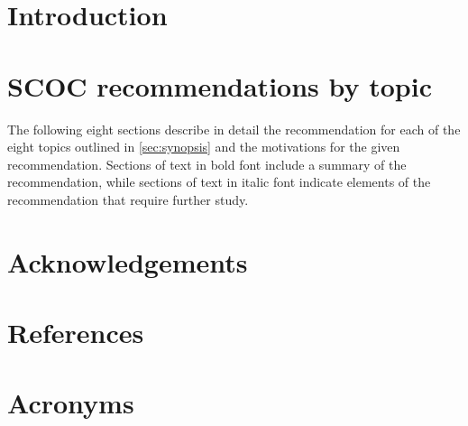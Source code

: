 \section{Introduction}




%
\clearpage
\section{SCOC recommendations by topic}\label{sec:rec}
The following eight sections describe in detail the recommendation for each of the eight topics outlined in \autoref{sec:synopsis} and the motivations for the given recommendation. Sections of text in bold font include a summary of the recommendation, while sections of text in italic font indicate elements of the recommendation that require further study. 


\clearpage



\section{Acknowledgements}

\section{References} \label{sec:bib}
\renewcommand{\refname}{} %



\section{Acronyms} \label{sec:acronyms}

